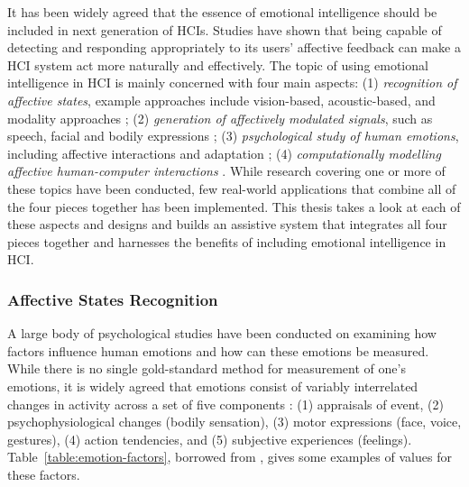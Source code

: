 It has been widely agreed that the essence of emotional intelligence should be included in next generation of HCIs. Studies have shown that being capable of detecting and responding appropriately to its users' affective feedback can make a HCI system act more naturally and effectively. The topic of using emotional intelligence in HCI is mainly concerned with four main aspects: (1) \textit{recognition of affective states}, example approaches include vision-based, acoustic-based, and modality approaches \cite{pantic2003toward, zeng2009survey}; (2) \textit{generation of affectively modulated signals}, such as speech, facial and bodily expressions \cite{cassell2000embodied, niewiadomski2013computational}; (3) \textit{psychological study of human emotions}, including affective interactions and adaptation \cite{scholl2013socio}; (4) \textit{computationally modelling affective human-computer interactions} \cite{hoey2013bayesian, pynadath2005psychsim, el2000flame, conati2009empirically}. While research covering one or more of these topics have been conducted, few real-world applications that combine all of the four pieces together has been implemented. This thesis takes a look at each of these aspects and designs and builds an assistive system that integrates all four pieces together and harnesses the benefits of including emotional intelligence in HCI.

\subsubsection{Affective States Recognition}

A large body of psychological studies have been conducted on examining how factors influence human emotions and how can these emotions be measured. While there is no single gold-standard method for measurement of one's emotions, it is widely agreed that emotions consist of variably interrelated changes in activity across a set of five components \cite{scherer2005emotions}: (1) appraisals of event, (2) psychophysiological changes (bodily sensation), (3) motor expressions (face, voice, gestures), (4) action tendencies, and (5) subjective experiences (feelings). Table~\ref{table:emotion-factors}, borrowed from \cite{scherer2005emotions}, gives some examples of values for these factors.

